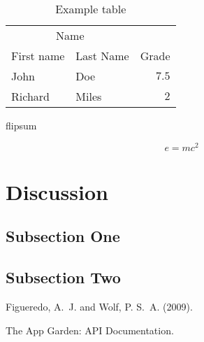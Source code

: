 \documentclass[twoside]{article}
\begin{document}
\begin{multicols}{2}
\begin{table}[H]
\caption{Example table}
\centering
\begin{tabular}{llr}
\toprule
\multicolumn{2}{c}{Name} \\
\cmidrule(r){1-2}
First name & Last Name & Grade \\
\midrule
John & Doe & $7.5$ \\
Richard & Miles & $2$ \\
\bottomrule
\end{tabular}
\end{table}
flipsum

\begin{equation}
\label{eq:emc}
e = mc^2
\end{equation}



\section{Discussion}

\subsection{Subsection One}


\subsection{Subsection Two}



\begin{thebibliography}{99} %

Figueredo, A.~J. and Wolf, P. S.~A. (2009).

The App Garden: API Documentation.
\end{thebibliography}


\end{multicols}
\end{document}
